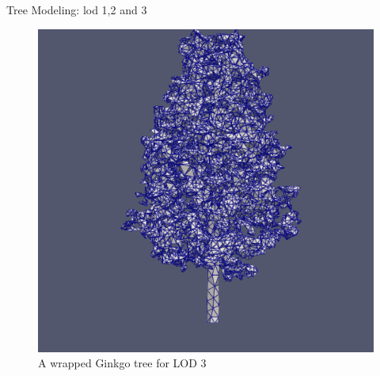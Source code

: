 \documentclass[10pt]{beamer}
\begin{document}
\begin{frame}{Tree Modeling: lod 1,2 and 3}
\begin{figure}[h]
\begin{minipage}{0.3\textwidth}
			\caption{A wrapped Ginkgo tree for LOD 2}
			\label{fig:figure2}
		\end{minipage}
		\begin{minipage}{0.33\textwidth}
			\centering
			\includegraphics[width=\textwidth]{images/tree-oval_lod3.png}
			\caption{A wrapped Ginkgo tree for LOD 3}
			\label{fig:figure2}
		\end{minipage}
	\end{figure}
\end{frame}
\end{document}

